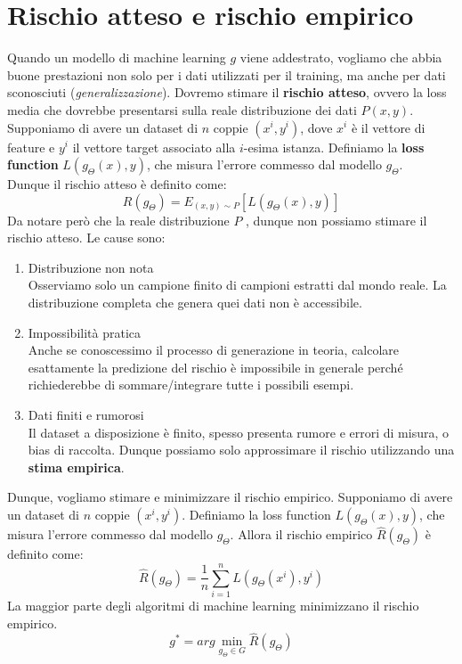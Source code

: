 \documentclass{../main.tex}[subfiles]
\begin{document}
\section{Rischio atteso e rischio empirico}
Quando un modello di machine learning $g$ viene addestrato, vogliamo che abbia buone prestazioni non solo per i dati utilizzati per il training, ma anche per dati sconosciuti (\textit{generalizzazione}).
Dovremo stimare il \textbf{rischio atteso}, ovvero la loss media che dovrebbe presentarsi sulla reale distribuzione dei dati $P(x,y)$. 
\\
Supponiamo di avere un dataset di $n$ coppie $(x^i,y^i)$, dove $x^i$ è il vettore di feature e $y^i$ il vettore target associato alla $i$-esima istanza.
Definiamo la \textbf{loss function} $L(g_\Theta(x),y)$, che misura l'errore commesso dal modello $g_\Theta$.
\\
Dunque il rischio atteso è definito come:
$$R(g_\Theta)=E_{(x,y)\sim P}[L(g_\Theta(x),y)]$$
Da notare però che la reale distribuzione $P$ , dunque non possiamo stimare il rischio atteso. Le cause sono:
\begin{enumerate}
	\item Distribuzione non nota \\
		Osserviamo solo un campione finito di campioni estratti dal mondo reale. La distribuzione completa che genera quei dati non è accessibile.
	\item Impossibilità pratica\\
		Anche se conoscessimo il processo di generazione in teoria, calcolare esattamente la predizione del rischio è impossibile in generale perché richiederebbe di sommare/integrare tutte i possibili esempi.
	\item Dati finiti e rumorosi\\
		Il dataset a disposizione è finito, spesso presenta rumore e errori di misura, o bias di raccolta. Dunque possiamo solo approssimare il rischio utilizzando una \textbf{stima empirica}.
\end{enumerate}
Dunque, vogliamo stimare e minimizzare il rischio empirico. Supponiamo di avere un dataset di $n$ coppie $(x^i,y^i)$.
Definiamo la loss function $L(g_\Theta(x),y)$, che misura l'errore commesso dal modello $g_\Theta$.
Allora il rischio empirico $\hat{R}(g_\Theta)$ è definito come:
$$\hat{R}(g_\Theta)=\frac{1}{n}\sum_{i=1}^n L(g_\Theta(x^i),y^i)$$
La maggior parte degli algoritmi di machine learning minimizzano il rischio empirico.
$$g^*=arg\min_{g_\Theta\in G}\hat{R}(g_\Theta)$$
\end{document}
